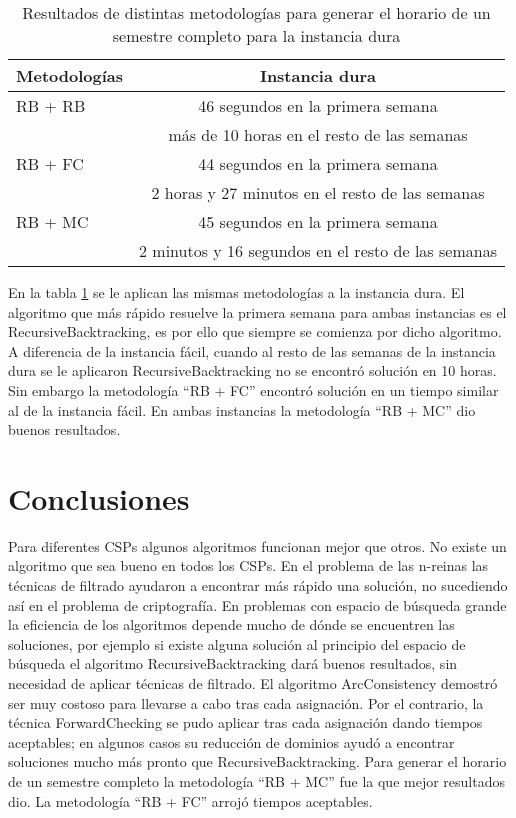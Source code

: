 \begin{table}[h]
	\caption{Resultados de distintas metodolog\'ias para generar el horario de un semestre completo para la instancia dura}
	\begin{center}
		\label{2semestre}
		\begin{tabular}{|l|c||}
			\hline \hline
			\textbf{Metodolog\'ias} & \textbf{Instancia dura} \\ \hline
			RB + RB & 46 segundos en la primera semana \\
			 &  m\'as de 10 horas en el resto de las semanas \\ \hline
			RB + FC & 44 segundos en la primera semana \\
			 & 2 horas y 27 minutos en el resto de las semanas \\ \hline
			RB + MC & 45 segundos en la primera semana \\
			 & 2 minutos y 16 segundos en el resto de las semanas \\ \hline
		\end{tabular}
	\end{center}
\end{table}

En la tabla \ref{2semestre} se le aplican las mismas metodolog\'ias a la instancia dura. El algoritmo que m\'as r\'apido resuelve la primera semana para ambas instancias es el \textsf{RecursiveBacktracking}, es por ello que siempre se comienza por dicho algoritmo. A diferencia de la instancia f\'acil, cuando al resto de las semanas de la instancia dura se le aplicaron \textsf{RecursiveBacktracking} no se encontr\'o soluci\'on en 10 horas. Sin embargo la metodolog\'ia ``RB + FC'' encontr\'o soluci\'on en un tiempo similar al de la instancia f\'acil. En ambas instancias la metodolog\'ia ``RB + MC'' dio buenos resultados.

\section{Conclusiones}

Para diferentes CSPs algunos algoritmos funcionan mejor que otros. No existe un algoritmo que sea bueno en todos los CSPs. En el problema de las n-reinas las t\'ecnicas de filtrado ayudaron a encontrar m\'as r\'apido una soluci\'on, no sucediendo as\'i en el problema de criptograf\'ia. En problemas con espacio de b\'usqueda grande la eficiencia de los algoritmos depende mucho de d\'onde se encuentren las soluciones, por ejemplo si existe alguna soluci\'on al principio del espacio de b\'usqueda el algoritmo \textsf{RecursiveBacktracking} dar\'a buenos resultados, sin necesidad de aplicar t\'ecnicas de filtrado. El algoritmo \textsf{ArcConsistency} demostr\'o ser muy costoso para llevarse a cabo tras cada asignaci\'on. Por el contrario, la t\'ecnica \textsf{ForwardChecking} se pudo aplicar tras cada asignaci\'on dando tiempos aceptables; en algunos casos su reducci\'on de dominios ayud\'o a encontrar soluciones mucho m\'as pronto que \textsf{RecursiveBacktracking}. Para generar el horario de un semestre completo la metodolog\'ia ``RB + MC'' fue la que mejor resultados dio. La metodolog\'ia ``RB + FC'' arroj\'o tiempos aceptables.

